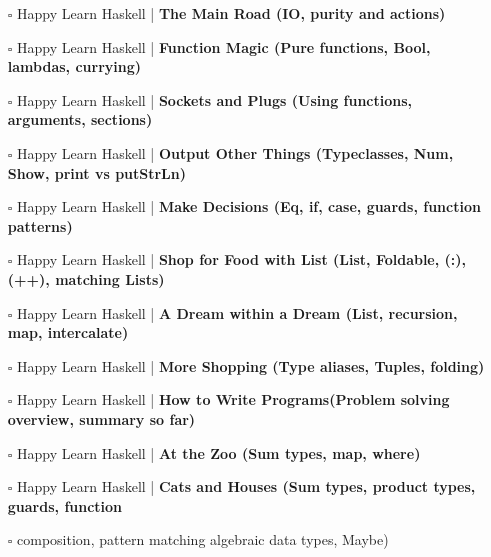 \documentclass[a4, landscape, 12pt]{article}
\newcommand{\checkbox}{$\square$}%
\begin{document}
\begin{itemize}
{}
\item [\checkbox]  Happy Learn Haskell | \textbf{ The Main Road (IO, purity and actions)
}
\item [\checkbox]  Happy Learn Haskell | \textbf{ Function Magic (Pure functions, Bool, lambdas, currying)
}
\item [\checkbox]  Happy Learn Haskell | \textbf{ Sockets and Plugs (Using functions, arguments, sections)
}
\item [\checkbox]  Happy Learn Haskell | \textbf{ Output Other Things (Typeclasses, Num, Show, print vs putStrLn)
}
\item [\checkbox]  Happy Learn Haskell | \textbf{ Make Decisions (Eq, if, case, guards, function patterns)
}
\item [\checkbox]  Happy Learn Haskell | \textbf{ Shop for Food with List (List, Foldable, (:), (++), matching Lists)
}
\item [\checkbox]  Happy Learn Haskell | \textbf{ A Dream within a Dream (List, recursion, map, intercalate)
}
\item [\checkbox]  Happy Learn Haskell | \textbf{ More Shopping (Type aliases, Tuples, folding)
}
\item [\checkbox]  Happy Learn Haskell | \textbf{ How to Write Programs(Problem solving overview, summary so far)
}
\item [\checkbox]  Happy Learn Haskell | \textbf{ At the Zoo (Sum types, map, where)
}
\item [\checkbox]  Happy Learn Haskell | \textbf{ Cats and Houses (Sum types, product types, guards, function 
}
\item [\checkbox]  composition, pattern matching algebraic data types, Maybe)


\end{itemize}
\end{document}
